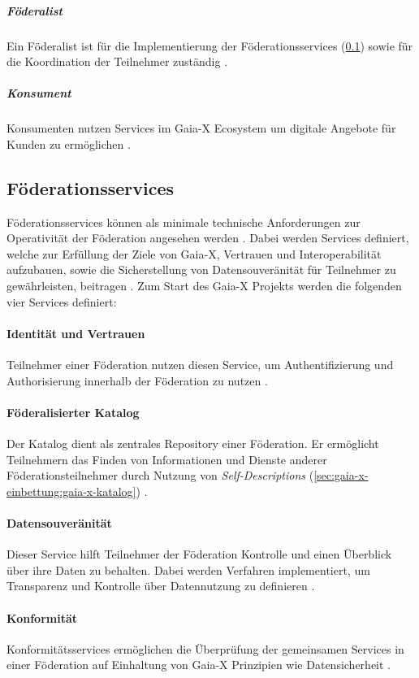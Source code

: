 \subparagraph{Föderalist}
Ein Föderalist ist für die Implementierung der Föderationsservices (\ref{subsec:gaia-x:federationservices}) 
sowie für die Koordination der Teilnehmer zuständig \cite{GXFS2021}.

\subparagraph{Konsument}
Konsumenten nutzen Services im Gaia-X Ecosystem um digitale Angebote für Kunden zu ermöglichen \cite{GaiaXArchitecture2021}.

\subsection{Föderationsservices}
\label{subsec:gaia-x:federationservices}
Föderationsservices können als minimale technische Anforderungen zur Operativität der Föderation angesehen werden \cite{GXFS2021}.
Dabei werden Services definiert, welche zur Erfüllung der Ziele von Gaia-X, Vertrauen und Interoperabilität
aufzubauen, sowie die Sicherstellung von Datensouveränität für Teilnehmer zu gewährleisten, beitragen \cite{GXFS2021}.
Zum Start des Gaia-X Projekts werden die folgenden vier Services definiert:

\paragraph{Identität und Vertrauen}
Teilnehmer einer Föderation nutzen diesen Service, um Authentifizierung und Authorisierung innerhalb der Föderation zu nutzen \cite{GXFS2021}.

\paragraph{Föderalisierter Katalog}
Der Katalog dient als zentrales Repository einer Föderation.
Er ermöglicht Teilnehmern das Finden von Informationen und Dienste anderer Föderationsteilnehmer durch Nutzung von
\emph{Self-Descriptions} (\ref{sec:gaia-x-einbettung:gaia-x-katalog}) \cite{GXFS2021}.

\paragraph{Datensouveränität}
Dieser Service hilft Teilnehmer der Föderation Kontrolle und einen Überblick über ihre Daten zu behalten.
Dabei werden Verfahren implementiert, um Transparenz und Kontrolle über Datennutzung zu definieren \cite{GXFS2021}.

\paragraph{Konformität}
Konformitätsservices ermöglichen die Überprüfung der gemeinsamen Services in einer Föderation auf Einhaltung
von Gaia-X Prinzipien wie Datensicherheit \cite{GXFS2021}.
